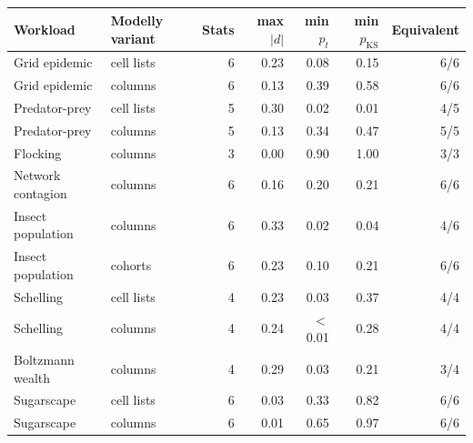 \begin{tabular}{llrrrrr}
\toprule
Workload & Modelly variant & Stats & max $|d|$ & min $p_{t}$ & min $p_{\mathrm{KS}}$ & Equivalent \\
\midrule
Grid epidemic & cell lists & 6 & 0.23 & 0.08 & 0.15 & 6/6 \\
Grid epidemic & columns & 6 & 0.13 & 0.39 & 0.58 & 6/6 \\
Predator-prey & cell lists & 5 & 0.30 & 0.02 & 0.01 & 4/5 \\
Predator-prey & columns & 5 & 0.13 & 0.34 & 0.47 & 5/5 \\
Flocking & columns & 3 & 0.00 & 0.90 & 1.00 & 3/3 \\
Network contagion & columns & 6 & 0.16 & 0.20 & 0.21 & 6/6 \\
Insect population & columns & 6 & 0.33 & 0.02 & 0.04 & 4/6 \\
Insect population & cohorts & 6 & 0.23 & 0.10 & 0.21 & 6/6 \\
Schelling & cell lists & 4 & 0.23 & 0.03 & 0.37 & 4/4 \\
Schelling & columns & 4 & 0.24 & $<$0.01 & 0.28 & 4/4 \\
Boltzmann wealth & columns & 4 & 0.29 & 0.03 & 0.21 & 3/4 \\
Sugarscape & cell lists & 6 & 0.03 & 0.33 & 0.82 & 6/6 \\
Sugarscape & columns & 6 & 0.01 & 0.65 & 0.97 & 6/6 \\
\bottomrule
\end{tabular}
